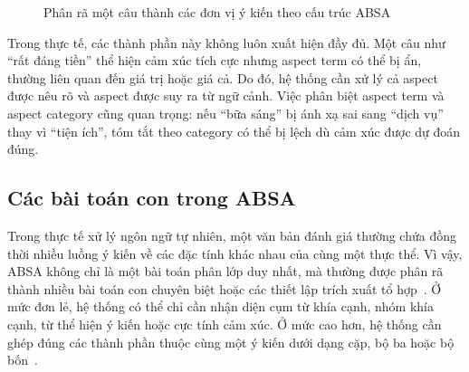 \begin{figure}[htbp]
\centering
{}
\caption{Phân rã một câu thành các đơn vị ý kiến theo cấu trúc ABSA}
\label{fig:chap2-absa-decomposition}
\end{figure}

Trong thực tế, các thành phần này không luôn xuất hiện đầy đủ. Một câu như ``rất đáng tiền'' thể hiện cảm xúc tích cực nhưng aspect term có thể bị ẩn, thường liên quan đến giá trị hoặc giá cả. Do đó, hệ thống cần xử lý cả aspect được nêu rõ và aspect được suy ra từ ngữ cảnh. Việc phân biệt aspect term và aspect category cũng quan trọng: nếu ``bữa sáng'' bị ánh xạ sai sang ``dịch vụ'' thay vì ``tiện ích'', tóm tắt theo category có thể bị lệch dù cảm xúc được dự đoán đúng.

\subsection{Các bài toán con trong ABSA}
\label{subsec:chap2-absa-subtasks}

Trong thực tế xử lý ngôn ngữ tự nhiên, một văn bản đánh giá thường chứa đồng thời nhiều luồng ý kiến về các đặc tính khác nhau của cùng một thực thể. Vì vậy, ABSA không chỉ là một bài toán phân lớp duy nhất, mà thường được phân rã thành nhiều bài toán con chuyên biệt hoặc các thiết lập trích xuất tổ hợp~\cite{pontiki2014semeval,pontiki2015semeval}. Ở mức đơn lẻ, hệ thống có thể chỉ cần nhận diện cụm từ khía cạnh, nhóm khía cạnh, từ thể hiện ý kiến hoặc cực tính cảm xúc. Ở mức cao hơn, hệ thống cần ghép đúng các thành phần thuộc cùng một ý kiến dưới dạng cặp, bộ ba hoặc bộ bốn~\cite{pontiki2014semeval}.


